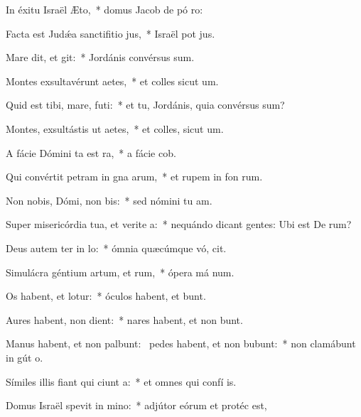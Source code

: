\item In éxitu Israël  Æto,~* domus Jacob de pó ro:
\item Facta est Judǽa sanctifitio jus,~* Israël pot jus.
\item Mare dit, et git:~* Jordánis convérsus  sum.
\item Montes exsultavérunt  aetes,~* et colles sicut  um.
\item Quid est tibi, mare,  futi:~* et tu, Jordánis, quia convérsus  sum?
\item Montes, exsultástis ut aetes,~* et colles, sicut  um.
\item A fácie Dómini ta est ra,~* a fácie  cob.
\item Qui convértit petram in gna arum,~* et rupem in fon rum.
\item Non nobis, Dómi, non bis:~* sed nómini tu  am.
\item Super misericórdia tua, et verite a:~* nequándo dicant gentes: Ubi est De rum?
\item Deus autem ter in lo:~* ómnia quæcúmque vó, cit.
\item Simulácra géntium artum, et rum,~* ópera má num.
\item Os habent, et  lotur:~* óculos habent, et  bunt.
\item Aures habent,  non dient:~* nares habent, et non bunt.
\item Manus habent, et non palbunt:~\pscross{} pedes habent, et non bubunt:~* non clamábunt in gút o.
\item Símiles illis fiant qui ciunt a:~* et omnes qui confí  is.
\item Domus Israël spevit in mino:~* adjútor eórum et protéc  est,
